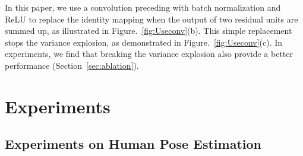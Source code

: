\documentclass[10pt,twocolumn,letterpaper]{article}
\begin{document}
In this paper, we use a  convolution preceding with batch normalization and ReLU to replace the identity mapping when the output of two residual units are summed up, as illustrated in Figure.~\ref{fig:Useconv}(b).  
This simple replacement stops the variance explosion, as demonstrated in Figure.~\ref{fig:Useconv}(c). 
In experiments, we find that breaking the variance explosion also provide a better performance (Section~\ref{sec:ablation}).


\section{Experiments}

\subsection{Experiments on Human Pose Estimation}
\end{document}
